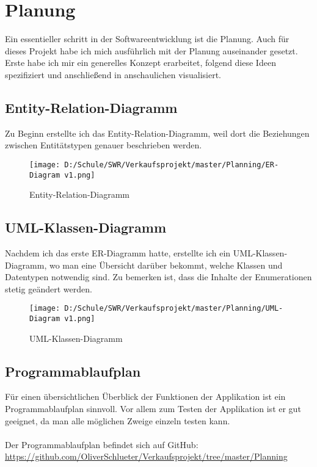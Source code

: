 \chapter{Planung}

Ein essentieller schritt in der Softwareentwicklung ist die Planung. Auch für dieses Projekt habe ich mich ausführlich mit der Planung auseinander gesetzt. Erste habe ich mir ein generelles Konzept erarbeitet, folgend diese Ideen spezifiziert und anschließend in anschaulichen visualisiert.

\section{Entity-Relation-Diagramm}
Zu Beginn erstellte ich das Entity-Relation-Diagramm, weil dort die Beziehungen zwischen Entitätstypen genauer beschrieben werden. 

\begin{figure}[h]
\texttt{[image: D:/Schule/SWR/Verkaufsprojekt/master/Planning/ER-Diagram v1.png]}
\caption{Entity-Relation-Diagramm}
\end{figure}

\newpage
\section{UML-Klassen-Diagramm}

Nachdem ich das erste ER-Diagramm hatte, erstellte ich ein UML-Klassen-Diagramm, wo man eine Übersicht darüber bekommt, welche Klassen und Datentypen notwendig sind. Zu bemerken ist, dass die Inhalte der Enumerationen stetig geändert werden.

\begin{figure}[h]
\texttt{[image: D:/Schule/SWR/Verkaufsprojekt/master/Planning/UML-Diagram v1.png]}
\caption{UML-Klassen-Diagramm}
\end{figure}

\newpage
\section{Programmablaufplan}

Für einen übersichtlichen Überblick der Funktionen der Applikation ist ein Programmablaufplan sinnvoll. Vor allem zum Testen der Applikation ist er gut geeignet, da man alle möglichen Zweige einzeln testen kann.\\
\\Der Programmablaufplan befindet sich auf GitHub: \url{https://github.com/OliverSchlueter/Verkaufsprojekt/tree/master/Planning}

